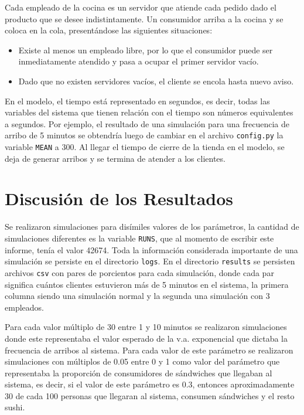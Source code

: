 \documentclass[a4paper, 10pt]{article}
\begin{document}
	Cada empleado de la cocina es un servidor que atiende cada pedido dado el producto 
	que se desee indistintamente. Un consumidor arriba a la cocina y se coloca en la cola,
	presentándose las siguientes situaciones:

	\begin{itemize}
		\item
			Existe al menos un empleado libre, por lo que el consumidor puede ser inmediatamente atendido y pasa
			a ocupar el primer servidor vacío.
		\item
			Dado que no existen servidores vacíos, el cliente se encola hasta nuevo aviso. 
	\end{itemize}

	En el modelo, el tiempo está representado en segundos, es decir, todas las variables del sistema que 
	tienen relación con el tiempo son números equivalentes a segundos. Por ejemplo, el resultado de una simulación
	para una frecuencia de arribo de 5 minutos se obtendría luego de cambiar en el archivo \verb!config.py! la variable
	\verb!MEAN! a 300. Al llegar el tiempo de cierre de la tienda en el modelo, se deja de generar arribos y se termina
	de atender a los clientes.

	\section{Discusión de los Resultados}
	Se realizaron simulaciones para disímiles valores de los parámetros, la cantidad de simulaciones diferentes es
	la variable \verb!RUNS!, que al momento de escribir este informe, tenía el valor 42674. Toda la información
	considerada importante de una simulación se persiste en el directorio \verb!logs!. En el directorio \verb!results!
	se persisten archivos \verb!csv! con pares de porcientos para cada simulación, donde cada par significa cuántos
	clientes estuvieron más de 5 minutos en el sistema, la primera columna siendo una simulación normal y la segunda
	una simulación con 3 empleados.

	Para cada valor múltiplo de 30 entre 1 y 10 minutos se realizaron simulaciones donde este representaba el valor
	esperado de la v.a. exponencial que dictaba la frecuencia de arribos al sistema. Para cada valor de este parámetro se
	realizaron simulaciones con múltiplos de 0.05 entre 0 y 1 como valor del parámetro que representaba la proporción de
	consumidores de sándwiches que llegaban al sistema, es decir, si el valor de este parámetro es 0.3, entonces aproximadamente
	30 de cada 100 personas que llegaran al sistema, consumen sándwiches y el resto sushi.
\end{document}
